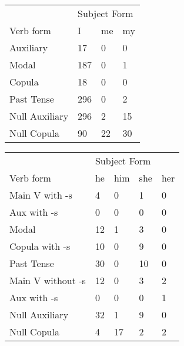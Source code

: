 \begin{table}[]
\begin{minipage}{0.5\textwidth}
    \centering
    \begin{tabular}{@{}llll@{}}
        \toprule
            &\multicolumn{3}{l}{Subject Form}\\
            \cline{2-4}
        Verb form & I & me & my \\
        \midrule
        Auxiliary & 17 & 0 & 0 \\
        Modal & 187 & 0 & 1 \\
        Copula & 18 & 0 & 0 \\
        Past Tense & 296 & 0 & 2 \\
        \hline
        Null Auxiliary & 296 & 2 & 15 \\
        Null Copula & 90 & 22 & 30 \\
        \bottomrule
    \end{tabular}
\end{minipage}
\begin{minipage}{0.5\textwidth}
    \centering
    \begin{tabular}{@{}lllll@{}}
        \toprule
            &\multicolumn{4}{l}{Subject Form}\\
            \cline{2-5}
        Verb form & he & him & she & her \\
        \midrule
        Main V with -s & 4 & 0 & 1 & 0 \\
        Aux with -s & 0 & 0 & 0 & 0 \\
        Modal & 12 & 1 & 3 & 0 \\
        Copula with -s & 10 & 0 & 9 & 0 \\
        Past Tense & 30 & 0 & 10 & 0 \\
        \hline
        Main V without -s & 12 & 0 & 3 & 2 \\
        Aux with -s & 0 & 0 & 0 & 1 \\
        Null Auxiliary & 32 & 1 & 9 & 0 \\
        Null Copula & 4 & 17 & 2 & 2 \\
        \bottomrule
    \end{tabular}
    \end{minipage}
\end{table}
